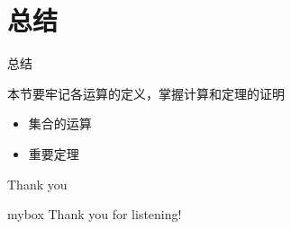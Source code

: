 \documentclass[xetex,10pt,aspectratio=43]{beamer}
\begin{document}
	\section{总结}
	
	\begin{frame}{总结}
		
		本节要牢记各运算的定义，掌握计算和定理的证明
		
		\begin{itemize}
			
			\item<1> 集合的运算
			
			\item<1> 重要定理
			
		\end{itemize}
		
	\end{frame}
	
	\begin{frame}{Thank you}
		\begin{center}
			\begin{minipage}{\textwidth}
				\begin{beamercolorbox}[wd=0.70\textwidth, rounded=true, shadow=true]{mybox}
					\LARGE \centering Thank you for listening!  %
				\end{beamercolorbox}
			\end{minipage}
		\end{center}
	\end{frame}
	
	
\end{document}
